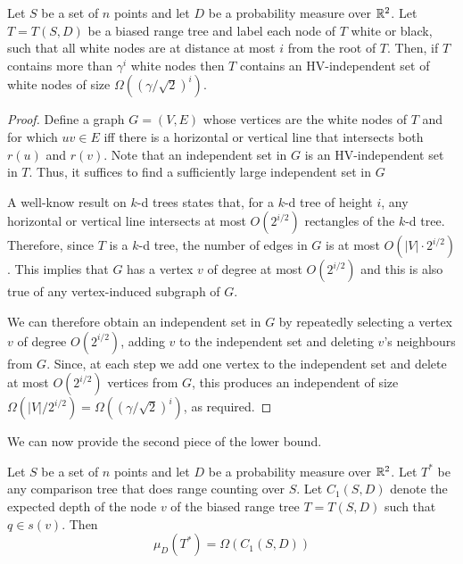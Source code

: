 \documentclass[lotsofwhite,charterfonts]{patmorin}
\begin{document}
\begin{lem}
Let $S$ be a set of $n$ points and let $D$ be a probability measure
over $\mathbb{R}^2$.
Let $T=T(S,D)$ be a biased range tree and label each node of $T$ white
or black, such that all white nodes are at distance at most $i$ from
the root of $T$.  Then, if $T$ contains more than $\gamma^i$ white nodes
then $T$ contains an HV-independent set of white nodes of size
$\Omega((\gamma/\sqrt{2})^i)$.
\end{lem}

\begin{proof}
Define a graph $G=(V,E)$ whose vertices are the white nodes of $T$ and
for which $uv\in E$ iff there is a horizontal or vertical line that
intersects both $r(u)$ and $r(v)$.  Note that an independent set in
$G$ is an HV-independent set in $T$.  Thus, it suffices to find a
sufficiently large independent set in $G$

A well-know result on $k$-d trees states that, for a $k$-d tree of
height $i$, any horizontal or vertical line intersects at most
$O(2^{i/2})$ rectangles of the $k$-d tree. Therefore, since $T$ is a
$k$-d tree, the number of edges in $G$ is at most $O(|V|\cdot
2^{i/2})$.  This implies that $G$ has a vertex $v$ of degree at most
$O(2^{i/2})$ and this is also true of any vertex-induced subgraph of
$G$.

We can therefore obtain an independent set in $G$ by repeatedly
selecting a vertex $v$ of degree $O(2^{i/2})$, adding $v$ to the
independent set and deleting $v$'s neighbours from $G$.  Since, at
each step we add one vertex to the independent set and delete at most
$O(2^{i/2})$ vertices from $G$, this produces an independent of size
$\Omega(|V|/2^{i/2}) = \Omega((\gamma/\sqrt{2})^i)$, as required.
\end{proof}

We can now provide the second piece of the lower bound.

\begin{lem}
Let $S$ be a set of $n$ points and let $D$ be a probability measure
over $\mathbb{R}^2$.
Let $T^*$ be any comparison tree that does range counting over $S$. Let
$C_1(S,D)$ denote the expected depth of the node $v$ of the biased
range tree $T=T(S,D)$ such that $q\in s(v)$.  Then
\[
    \mu_D(T^*) = \Omega(C_1(S,D))
\]
\end{lem}
\end{document}
